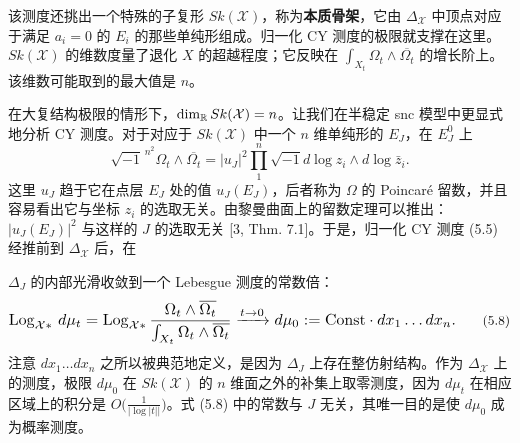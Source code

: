 

该测度还挑出一个特殊的子复形 $Sk(\mathcal{X})$，称为\textbf{本质骨架}，它由 $\Delta_{\mathcal{X}}$ 中顶点对应于满足 $a_i=0$ 的 $E_i$ 的那些单纯形组成。归一化 CY 测度的极限就支撑在这里。$Sk(\mathcal{X})$ 的维数度量了退化 $X$ 的超越程度；它反映在 $\int_{X_t}\Omega_t\wedge\overline{\Omega_t}$ 的增长阶上。该维数可能取到的最大值是 $n$。

在大复结构极限的情形下，$\dim_{\mathbb{R}}Sk(\mathcal{X})=n$。让我们在半稳定 snc 模型中更显式地分析 CY 测度。对于对应于 $Sk(\mathcal{X})$ 中一个 $n$ 维单纯形的 $E_J$，在 $E^0_J$ 上
\begin{equation}
\sqrt{-1}^{\,n^2}\Omega_t\wedge\overline{\Omega_t} = |u_J|^2\prod_{1}^{n}\sqrt{-1}d\log z_i\wedge d\log\bar z_i. \tag{5.7}
\end{equation}
这里 $u_J$ 趋于它在点层 $E_J$ 处的值 $u_J(E_J)$，后者称为 $\Omega$ 的 Poincaré 留数，并且容易看出它与坐标 $z_i$ 的选取无关。由黎曼曲面上的留数定理可以推出：$|u_J(E_J)|^2$ 与这样的 $J$ 的选取无关 [3, Thm. 7.1]。于是，归一化 CY 测度 (5.5) 经推前到 $\Delta_{\mathcal{X}}$ 后，在


$\Delta_J$ 的内部光滑收敛到一个 Lebesgue 测度的常数倍：
\begin{equation}
\resizebox{0.97\textwidth}{!}{$\displaystyle \operatorname{Log}_{\mathcal{X}*}\,d\mu_t = \operatorname{Log}_{\mathcal{X}*}\frac{\Omega_t\wedge\overline{\Omega_t}}{\int_{X_t}\Omega_t\wedge\overline{\Omega_t}}\xrightarrow{t\to0} d\mu_0 := \mathrm{Const}\cdot dx_1\dots dx_n.$} \tag{5.8}
\end{equation}
注意 $dx_1\dots dx_n$ 之所以被典范地定义，是因为 $\Delta_J$ 上存在整仿射结构。作为 $\Delta_{\mathcal{X}}$ 上的测度，极限 $d\mu_0$ 在 $Sk(\mathcal{X})$ 的 $n$ 维面之外的补集上取零测度，因为 $d\mu_t$ 在相应区域上的积分是 $O\big(\frac{1}{|\log|t||}\big)$。式 (5.8) 中的常数与 $J$ 无关，其唯一目的是使 $d\mu_0$ 成为概率测度。


